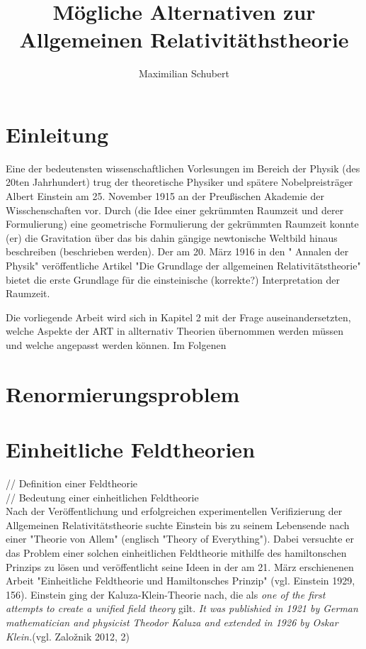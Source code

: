 \documentclass[a4paper, 12pt]{article}
\begin{document}
\title{Mögliche Alternativen zur Allgemeinen Relativitäthstheorie}
\author{Maximilian Schubert}
\date{}
\maketitle
\section{Einleitung} 

Eine der bedeutensten wissenschaftlichen Vorlesungen im Bereich der Physik (des 20ten Jahrhundert) trug der theoretische Physiker und spätere Nobelpreisträger Albert Einstein am 25. November 1915 an der Preußischen Akademie der Wisschenschaften vor. Durch (die Idee einer gekrümmten Raumzeit und derer Formulierung) eine geometrische Formulierung der gekrümmten Raumzeit konnte (er) die Gravitation über das bis dahin gängige newtonische Weltbild hinaus beschreiben (beschrieben werden). Der am 20. März 1916 in den " Annalen der Physik" veröffentliche Artikel "Die Grundlage der allgemeinen Relativitätstheorie"  bietet die erste Grundlage für die einsteinische (korrekte?) Interpretation der Raumzeit. 

Die vorliegende Arbeit wird sich in Kapitel 2 mit der Frage auseinandersetzten, welche Aspekte der ART in allternativ Theorien übernommen werden müssen und welche angepasst werden können. Im Folgenen 
\section{Renormierungsproblem}
\section{Einheitliche Feldtheorien}
 // Definition einer Feldtheorie\\
 // Bedeutung einer einheitlichen Feldtheorie\\
 Nach der Veröffentlichung und erfolgreichen experimentellen Verifizierung der Allgemeinen Relativitätstheorie suchte Einstein bis zu seinem Lebensende nach einer "Theorie von Allem" (englisch "Theory of Everything"). Dabei versuchte er das Problem einer solchen einheitlichen Feldtheorie mithilfe des hamiltonschen Prinzips zu lösen und veröffentlicht seine Ideen in der am 21. März erschienenen Arbeit "Einheitliche Feldtheorie und Hamiltonsches Prinzip" (vgl. Einstein 1929, 156). Einstein ging der Kaluza-Klein-Theorie nach, die als \textit{one of the first attempts to create a unified field theory} gilt. \textit{It was publishied in 1921 by German mathematician and physicist Theodor Kaluza and extended in 1926 by Oskar Klein.}(vgl. Zalo\v{z}nik 2012, 2)
 
\end{document}
